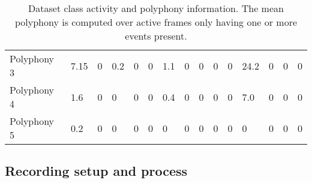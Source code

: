 \documentclass{article}
\begin{document}
\begin{sloppy}
\begin{table*}[ht]
\begin{adjustbox}{max width=\textwidth}
\begin{tabular}{l||l||l|l|l|l|l|l|l|l|l|l|l|l|l}
Polyphony 3                                                                 & 7.15            & 0                                                                & 0.2                                                             & 0                 & 0                  & 1.1               & 0                                                                  & 0                  & 0             & 0              & 24.2                                                                  & 0                  & 0             & 0              \\
Polyphony 4                                                                 & 1.6             & 0                                                                & 0                                                               & 0                 & 0                  & 0.4               & 0                                                                  & 0                  & 0             & 0              & 7.0                                                                   & 0                  & 0             & 0              \\
Polyphony 5                                                                 & 0.2             & 0                                                                & 0                                                               & 0                 & 0                  & 0                 & 0                                                                  & 0                  & 0             & 0              & 0                                                                     & 0                  & 0             & 0             
\end{tabular}
\end{adjustbox}
\caption{Dataset class activity and polyphony information. The mean polyphony is computed over active frames only having one or more events present.}
\label{table:class_activity}
\end{table*}
 
\subsection{Recording setup and process}


\end{sloppy}
\end{document}
